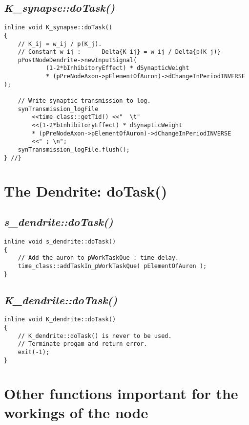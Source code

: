 \subsection{\emph{K\_synapse::doTask()}}
\begin{lstlisting}
inline void K_synapse::doTask()
{ 
	// K_ij = w_ij / p(K_j).
	// Constant w_ij : 		Delta{K_ij} = w_ij / Delta{p(K_j)}
	pPostNodeDendrite->newInputSignal( 
			(1-2*bInhibitoryEffect) * dSynapticWeight  
			* (pPreNodeAxon->pElementOfAuron)->dChangeInPeriodINVERSE );

	// Write synaptic transmission to log.
	synTransmission_logFile
		<<time_class::getTid() <<"  \t"
		<<(1-2*bInhibitoryEffect) * dSynapticWeight  
		* (pPreNodeAxon->pElementOfAuron)->dChangeInPeriodINVERSE
		<<" ; \n";
	synTransmission_logFile.flush();
} //}
\end{lstlisting}




\section{The Dendrite: doTask()}
\label{appendixDoTaskForDendrite}


\subsection{\emph{s\_dendrite::doTask()}}
\begin{lstlisting}
inline void s_dendrite::doTask()
{ 
	// Add the auron to pWorkTaskQue : time delay.
	time_class::addTaskIn_pWorkTaskQue( pElementOfAuron );
}

\end{lstlisting}

\subsection{\emph{K\_dendrite::doTask()}}
\begin{lstlisting}
inline void K_dendrite::doTask()
{
	// K_dendrite::doTask() is never to be used. 
	// Terminate progam and return error.
	exit(-1);
}

\end{lstlisting}


\section{Other functions important for the workings of the node}


